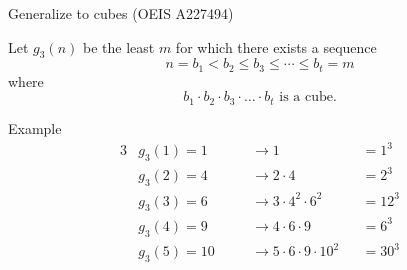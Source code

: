 \documentclass{beamer}
\begin{document}
\begin{frame}{Generalize to cubes (OEIS A227494)}

  Let $g_3(n)$ be the least $m$ for which there exists a sequence
    \[n = b_1 < b_2 \leq b_3 \leq \cdots \leq b_t = m\]
  where \[
    b_1 \cdot b_2 \cdot b_3 \cdot \hdots \cdot b_t \text{ is a cube.}
  \]

    \begin{block}{Example}
    \setlength\abovedisplayskip{-10pt}
    \begin{alignat*}{3}
      & g_3(1) = 1  \quad && \rightarrow 1                                &&= 1^3 \\
      & g_3(2) = 4  \quad && \rightarrow 2 \cdot 4                        &&= 2^3 \\
      & g_3(3) = 6  \quad && \rightarrow 3 \cdot 4^2 \cdot 6^2            &&= 12^3 \\
      & g_3(4) = 9  \quad && \rightarrow 4 \cdot 6   \cdot 9              &&= 6^3 \\
      & g_3(5) = 10 \quad && \rightarrow 5 \cdot 6   \cdot 9   \cdot 10^2 &&= 30^3
    \end{alignat*}
    \end{block}
\end{frame}
\end{document}
